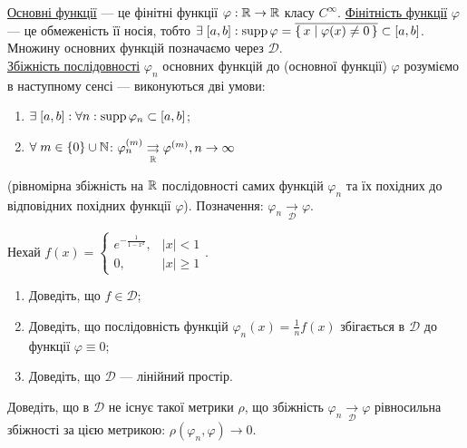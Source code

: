 
\begin{theory}
    \ul{Основні функції} --- це фінітні функції $\varphi: \mathbb{R} \to \mathbb{R}$ класу $C^\infty$.
    \ul{Фінітність функції} $\varphi$ --- це обмеженість її носія, тобто $\exists\;[a,b]:
    \operatorname{supp} \varphi = \overline{\set{x \mid \varphi(x)\neq 0}} \subset [a,b]$. Множину основних
    функцій позначаємо через $\mathcal{D}$.\\
    \ul{Збіжність послідовності} $\varphi_n$ основних функцій до (основної функції) $\varphi$
    розуміємо в наступному сенсі --- виконуються дві умови:
    \begin{enumerate}
        \item $\exists \;[a,b]: \forall n: \operatorname{supp}\varphi_n \subset [a,b]$;
        \item $\forall \; m \in \{0\} \cup \mathbb{N}$:
        $\varphi_n^{(m)} \underset{\mathbb{R}}{\rightrightarrows} \varphi^{(m)}, n\to\infty$
    \end{enumerate}
    (рівномірна збіжність на $\mathbb{R}$ послідовності самих функцій $\varphi_n$ та їх похідних
    до відповідних похідних функції $\varphi$). Позначення: $\varphi_n \underset{\mathcal{D}}{\to} \varphi$.
\end{theory}

\begin{exercise}
    Нехай $f(x) = \begin{cases}
        e^{-\frac{1}{1-x^2}}, & |x| < 1 \\
        0, & |x| \geq 1
    \end{cases}$.
    \begin{enumerate}
        \item Доведіть, що $f \in \mathcal{D}$;
        \item Доведіть, що послідовність функцій $\varphi_n(x)=\frac{1}{n}f(x)$ збігається
              в $\mathcal{D}$ до функції $\varphi \equiv 0$;
        \item Доведіть, що $\mathcal{D}$ --- лінійний простір.
    \end{enumerate}
\end{exercise}

\begin{exercise}
    Доведіть, що в $\mathcal{D}$ не існує такої метрики $\rho$, що збіжність
    $\varphi_n \underset{\mathcal{D}}{\to} \varphi$ рівносильна збіжності за цією метрикою:
    $\rho(\varphi_n,\varphi) \to 0$.
\end{exercise}

